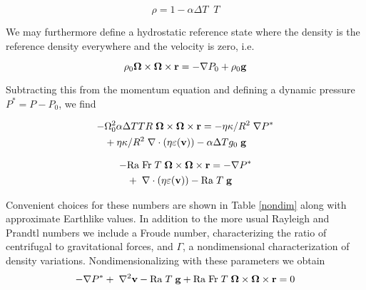 \documentclass[extra]{gji}
\begin{document}
\begin{equation}
\rho = 1 - \alpha \Delta T \;\;  T
\end{equation}

We may furthermore define a hydrostatic reference state where the density is the reference density everywhere and the velocity is zero, i.e.

\begin{equation}
 \rho_0{\bf \Omega \times \Omega \times r}= - \nabla P_0 + \rho_0 {\bf g}
\label{navier_stokes}
\end{equation}

Subtracting this from the momentum equation and defining a dynamic pressure $P^* = P - P_0$, we find

\begin{equation}
\begin{aligned}
 - & \Omega_0^2  \alpha  \Delta T T R \; {\bf \Omega \times \Omega \times r} = - \eta \kappa / R^2 \; \nabla P^* \\ 
&+ \eta \kappa / R^2 \; \nabla \cdot \left( \eta \varepsilon ({\bf v}) \right) - \alpha \Delta T g_0 \; {\bf g}
\end{aligned}
\end{equation}

\begin{equation}
\begin{aligned}
 - & \mathrm{Ra \; Fr}\; T \; {\bf \Omega \times \Omega \times r} = - \nabla P^* \\ 
&+ \; \nabla \cdot \left( \eta \varepsilon ({\bf v}) \right) - \mathrm{Ra} \; T \; {\bf g}
\end{aligned}
\end{equation}

  
\fi


Convenient choices for these numbers are shown in Table \ref{nondim} along with approximate Earthlike values.
In addition to the more usual Rayleigh and Prandtl numbers we include a Froude number, characterizing the ratio of centrifugal to gravitational forces, and $\Gamma$, a nondimensional characterization of density variations.
Nondimensionalizing with these parameters we obtain
\begin{equation}
\begin{aligned}
 - \nabla P^* + \; \nabla^2{\bf v} - \mathrm{Ra} \; T \; {\bf g} + \mathrm{Ra \; Fr}\; T \;{\bf \Omega \times \Omega \times r} = 0
\end{aligned}
\end{equation}
\end{document}
